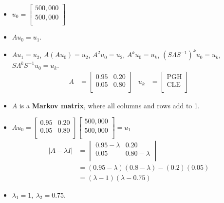 \documentclass{article}
\begin{document}
\begin{itemize}
    \item $
        u_0 =
        \begin{bmatrix}
            500,000\\
            500,000\\
        \end{bmatrix}
    $
    \item $Au_0 = u_1$.
    \item $Au_1 = u_2$, $A(Au_0) = u_2$, $A^2u_0 = u_2$, $A^ku_0 = u_k$, $(S\Lambda S^{-1})^ku_0 = u_k$, $S\Lambda^kS^{-1}u_0 = u_k$.
    \begin{align*}
        A &=
        \begin{bmatrix}
            0.95 & 0.20\\
            0.05 & 0.80\\
        \end{bmatrix}&
        u_k &=
        \begin{bmatrix}
            \text{PGH}\\
            \text{CLE}\\
        \end{bmatrix}
    \end{align*}
    \item $A$ is a \textbf{Markov matrix}, where all columns and rows add to 1.
    \item $
        Au_0 =
        \begin{bmatrix}
            0.95 & 0.20\\
            0.05 & 0.80\\
        \end{bmatrix}
        \begin{bmatrix}
            500,000\\
            500,000\\
        \end{bmatrix}
        = u_1
    $
    \begin{align*}
        |A-\lambda I| &=
        \begin{vmatrix}
            0.95-\lambda & 0.20\\
            0.05 & 0.80-\lambda\\
        \end{vmatrix}\\
        &= (0.95-\lambda)(0.8-\lambda)-(0.2)(0.05)\\
        &= (\lambda-1)(\lambda-0.75)
    \end{align*}
    \item $\lambda_1 = 1,\ \lambda_2 = 0.75$.

\end{itemize}
\end{document}
